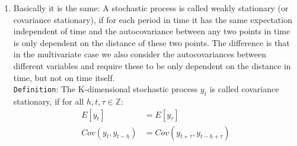 \begin{enumerate}
\item Basically it is the same:
A stochastic process is called weakly stationary (or covariance stationary),
  if for each period in time it has the same expectation independent of time
  and the autocovariance between any two points in time is only dependent on the distance of these two points.
The difference is that in the multivariate case we also consider the autocovariances between different variables
  and require these to be only dependent on the distance in time, but not on time itself.
\\
\texttt{Definition}: The K-dimensional stochastic process \(y_t\) is called covariance stationary, if for all \(h,t,\tau \in \mathbb{Z}\):
\begin{align}
E[{y_t}] &= E[{y_\tau}]\\
Cov(y_{t},y_{t-h}) &= Cov(y_{t+\tau}, y_{t-h+\tau}) \label{gammas}
\end{align}


\end{enumerate}
